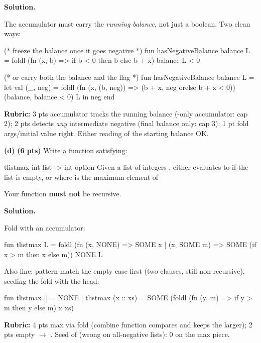 \documentclass[crop=false]{standalone}
\newif\ifsol
\newenvironment{solution}
    {\par\color{solution_color}\begin{framed}\textbf{Solution.}\par}
    {\end{framed}}
\newcommand{\subpts}[1]{\textbf{(#1 pts)}}
\newcommand{\answerspace}[1]{\ifsol\else\vspace{#1}\par\fi}
\begin{document}
\answerspace{5cm}

\begin{solution}
The accumulator must carry the \emph{running balance}, not just a
boolean. Two clean ways:

\begin{codeblock}
  (* freeze the balance once it goes negative *)
  fun hasNegativeBalance balance L =
    foldl (fn (x, b) => if b < 0 then b else b + x) balance L < 0

  (* or carry both the balance and the flag *)
  fun hasNegativeBalance balance L =
    let
      val (_, neg) =
        foldl (fn (x, (b, neg)) => (b + x, neg orelse b + x < 0))
              (balance, balance < 0) L
    in
      neg
    end
\end{codeblock}

\textbf{Rubric:} 3 pts accumulator tracks the running balance
(-only accumulator: cap 2); 2 pts detects \emph{any}
intermediate negative (final balance only: cap 3); 1 pt fold
args/initial value right. Either reading of the starting balance OK.
\end{solution}

\textbf{(d)} \subpts{6} Write a function  satisfying:

\spec
  {tlistmax}
  {int list -> int option}
  {}
  {Given a list of integers ,  either evaluates to
   if the list is empty, or  where  is the maximum element of }

\begin{constraint}
  Your function \textbf{must not} be recursive.
\end{constraint}

\answerspace{5cm}

\begin{solution}
Fold with an  accumulator:

\begin{codeblock}
  fun tlistmax L =
    foldl (fn (x, NONE) => SOME x
            | (x, SOME m) => SOME (if x > m then x else m))
          NONE L
\end{codeblock}

Also fine: pattern-match the empty case first (two clauses, still
non-recursive), seeding the fold with the head:

\begin{codeblock}
  fun tlistmax [] = NONE
    | tlistmax (x :: xs) =
        SOME (foldl (fn (y, m) => if y > m then y else m) x xs)
\end{codeblock}

\textbf{Rubric:} 4 pts max via fold (combine function compares and
keeps the larger); 2 pts empty $\to$ . Seed of 
(wrong on all-negative lists): 0 on the max piece.
\end{solution}
\end{document}
